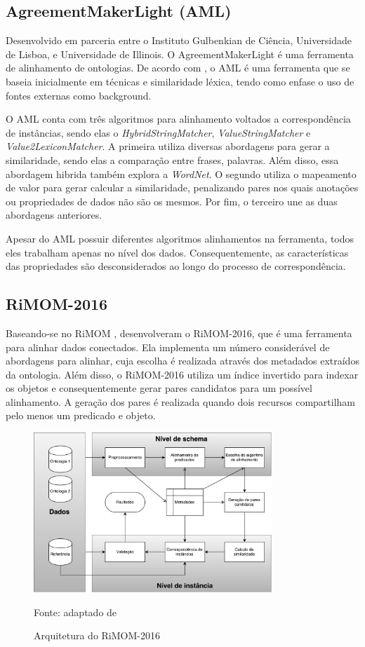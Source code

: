 \subsection{AgreementMakerLight (AML)}
Desenvolvido em parceria entre o Instituto Gulbenkian de Ciência, Universidade de Lisboa, e Universidade de Illinois. O AgreementMakerLight é uma ferramenta de alinhamento de ontologias. De acordo com \cite{fariaoaei}, o AML é uma ferramenta que se baseia inicialmente em técnicas e similaridade léxica, tendo como enfase o uso de fontes externas como background.

O AML conta com três algoritmos para alinhamento voltados a correspondência de instâncias, sendo elas o \textit{HybridStringMatcher}, \textit{ValueStringMatcher} e \textit{Value2LexiconMatcher}. A primeira utiliza diversas abordagens para gerar a similaridade, sendo elas a comparação entre frases, palavras. Além disso, essa abordagem hibrida também explora a \textit{WordNet}. O segundo utiliza o mapeamento de valor para gerar calcular a similaridade, penalizando pares nos quais anotações ou propriedades de dados não são os mesmos. Por fim, o terceiro une as duas abordagens anteriores.

Apesar do AML possuir diferentes algoritmos alinhamentos na ferramenta, todos eles trabalham apenas no nível dos dados. Consequentemente, as características das propriedades são desconsiderados ao longo do processo de correspondência.

\subsection{RiMOM-2016}
Baseando-se no RiMOM  \cite{li2009rimom}, \cite{zhang2016rimom} desenvolveram o RiMOM-2016, que é uma ferramenta para alinhar dados conectados. Ela implementa um número considerável de abordagens para alinhar, cuja escolha é realizada através dos metadados extraídos da ontologia. Além disso, o RiMOM-2016 utiliza um índice invertido para indexar os objetos e consequentemente gerar pares candidatos para um possível alinhamento. A geração dos pares é realizada quando dois recursos compartilham pelo menos um predicado e objeto.

\begin{figure}[!ht]
	\centering
	\includegraphics[width=0.8\textwidth]{./imagens/rimom_2016.pdf}
	\caption{Arquitetura do RiMOM-2016}
	\footnotesize{Fonte: adaptado de \cite{zhang2016rimom}}
	\label{fig:rimom}
\end{figure}

